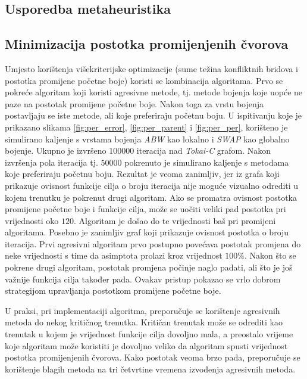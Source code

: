 \documentclass[times, utf8, diplomski, numeric]{fer}
\begin{document}
\subsection{Usporedba metaheuristika}

\subsection{Minimizacija postotka promijenjenih čvorova}

Umjesto korištenja višekriterijske optimizacije (sume težina konfliktnih bridova i postotka promijene početne boje) koristi se kombinacija algoritama. Prvo se pokreće algoritam koji koristi agresivne metode, tj. metode bojenja koje uopće ne paze na postotak promijene početne boje. Nakon toga za vrstu bojenja postavljaju se iste metode, ali koje preferiraju početnu boju. U ispitivanju koje je prikazano slikama \ref{fig:per_error}, \ref{fig:per_parent} i \ref{fig:per_per}, korišteno je simulirano kaljenje s vrstama bojenja \emph{ABW} kao lokalno i \emph{SWAP} kao globalno bojenje. Ukupno je izvršeno $100000$ iteracija nad \emph{Tokai-C} grafom. Nakon izvršenja pola iteracija tj. $50000$ pokrenuto je simulirano kaljenje s metodama koje preferiraju početnu boju. Rezultat je veoma zanimljiv, jer iz grafa koji prikazuje ovisnost funkcije cilja o broju iteracija nije moguće vizualno odrediti u kojem trenutku je pokrenut drugi algoritam. Ako se promatra ovisnost postotka promijene početne boje i funkcije cilja, može se uočiti veliki pad postotka pri vrijednosti oko $120$. Algoritam je došao do te vrijednosti baš pri promijeni algoritama. Posebno je zanimljiv graf koji prikazuje ovisnost postotka o broju iteracija. Prvi agresivni algoritam prvo postupno povećava postotak promjena do neke vrijednosti s time da asimptota prolazi kroz vrijednost $100\%$. Nakon što se pokrene drugi algoritam, postotak promjena počinje naglo padati, ali što je još važnije funkcija cilja također pada. Ovakav pristup pokazao se vrlo dobrom strategijom upravljanja postotkom promijene početne boje.

U praksi, pri implementaciji algoritma, preporučuje se korištenje agresivnih metoda do nekog kritičnog trenutka. Kritičan trenutak može se odrediti kao trenutak u kojem je vrijednost funkcije cilja dovoljno mala, a preostalo vrijeme koje algoritam može koristiti je dovoljno veliko da algoritam spusti vrijednost postotka promijenjenih čvorova. Kako postotak veoma brzo pada, preporučuje se korištenje blagih metoda na tri četvrtine vremena izvođenja agresivnih metoda.
\end{document}
